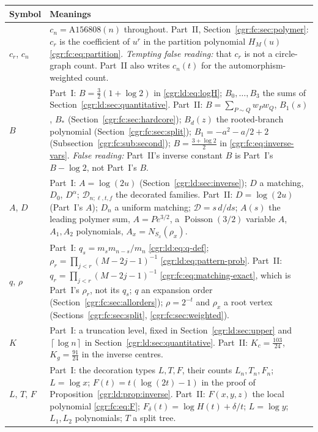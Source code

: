 \documentclass[11pt,letterpaper]{article}
\numberwithin{equation}{section}
\theoremstyle{definition}\newtheorem{definition}[theorem]{Definition}
\theoremstyle{remark}\newtheorem{remark}[theorem]{Remark}
\newcommand{\ceil}[1]{\left\lceil #1\right\rceil}
\DeclareMathOperator{\Poi}{Poisson}
\begin{document}
\begin{longtable}{@{}>{\raggedright\arraybackslash}p{} >{\raggedright\arraybackslash}p{}@{}}
\toprule
Symbol & Meanings\\
\midrule
\endhead
$c_r$, $c_n$ & $c_n=\mathrm{A156808}(n)$ throughout. Part~II, Section~\ref{cgr:fc:sec:polymer}: $c_r$ is the coefficient of $u^r$ in the partition polynomial $H_M(u)$ \eqref{cgr:fc:eq:partition}. \emph{Tempting false reading:} that $c_r$ is not a circle-graph count. Part~II also writes $c_n(t)$ for the automorphism-weighted count.\\
$B$ & Part~I: $B=\frac32(1+\log2)$ in \eqref{cgr:ld:eq:logH}; $B_0,\ldots,B_3$ the sums of Section~\ref{cgr:ld:sec:quantitative}. Part~II: $B=\sum_{P\sim Q}w_Pw_Q$, $B_1(s)$, $B_*$ (Section~\ref{cgr:fc:sec:hardcore}); $B_d(z)$ the rooted-branch polynomial (Section~\ref{cgr:fc:sec:split}); $B_1=-a^2-a/2+2$ (Subsection~\ref{cgr:fc:sub:second}); $B=\frac{3+\log2}2$ in \eqref{cgr:fc:eq:inverse-vars}. \emph{False reading:} Part~II's inverse constant $B$ is Part~I's $B-\log2$, not Part~I's $B$.\\
$A$, $D$ & Part~I: $A=\log(2u)$ (Section~\ref{cgr:ld:sec:inverse}); $D$ a matching, $D_0$, $D^\alpha$; $\mathcal D_{n;\ell,t,f}$ the decorated families. Part~II: $D=\log(2u)$ (Part~I's $A$); $D_n$ a uniform matching; $\mathcal D=s\,d/ds$; $A(s)$ the leading polymer sum, $A=Pe^{3/2}$, a $\Poi(3/2)$ variable $A$, $A_1,A_2$ polynomials, $A_x=N_{S_x}(\rho_x)$.\\
$q$, $\rho$ & Part~I: $q_s=m_sm_{n-s}/m_n$ \eqref{cgr:ld:eq:q-def}; $\rho_r=\prod_{j<r}(M-2j-1)^{-1}$ \eqref{cgr:ld:eq:pattern-prob}. Part~II: $q_r=\prod_{j<r}(M-2j-1)^{-1}$ \eqref{cgr:fc:eq:matching-exact}, which is Part~I's $\rho_r$, not its $q_s$; $q$ an expansion order (Section~\ref{cgr:fc:sec:allorders}); $\rho=2^{-t}$ and $\rho_x$ a root vertex (Sections~\ref{cgr:fc:sec:split}, \ref{cgr:fc:sec:weighted}).\\
$K$ & Part~I: a truncation level, fixed in Section~\ref{cgr:ld:sec:upper} and $\ceil{\log n}$ in Section~\ref{cgr:ld:sec:quantitative}. Part~II: $K_c=\frac{103}{24}$, $K_g=\frac{91}{24}$ in the inverse centres.\\
$L$, $T$, $F$ & Part~I: the decoration types $L,T,F$, their counts $L_n,T_n,F_n$; $L=\log x$; $F(t)=t(\log(2t)-1)$ in the proof of Proposition~\ref{cgr:ld:prop:inverse}. Part~II: $F(x,y,z)$ the local polynomial \eqref{cgr:fc:eq:F}; $F_\delta(t)=\log H(t)+\delta/t$; $L=\log y$; $L_1,L_2$ polynomials; $T$ a split tree.\\

\end{longtable}
\end{document}
